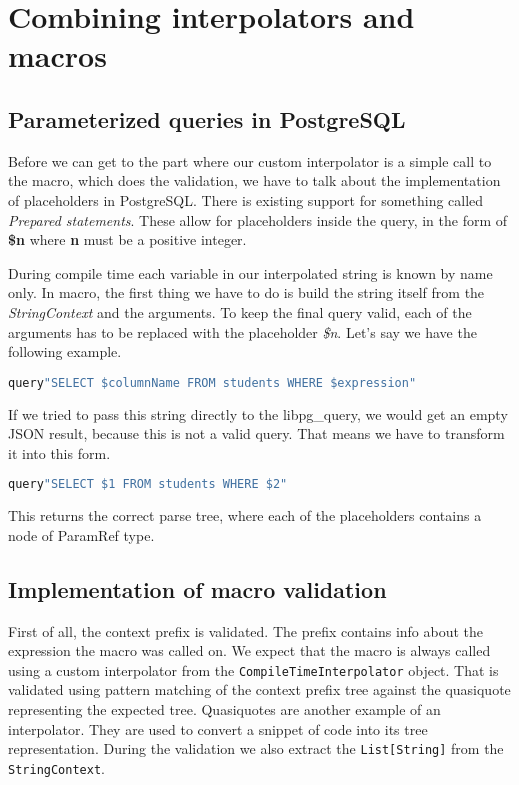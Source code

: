 \section{Combining interpolators and macros}
\subsection{Parameterized queries in PostgreSQL}
Before we can get to the part where our custom interpolator is a simple call to the macro, which does the validation, we have to talk about the implementation of placeholders in PostgreSQL. There is existing support for something called \textit{Prepared statements}. These allow for placeholders inside the query, in the form of \textbf{\$n} where \textbf{n} must be a positive integer.  

During compile time each variable in our interpolated string is known by name only. In macro, the first thing we have to do is build the string itself from the \textit{StringContext} and the arguments. To keep the final query valid, each of the arguments has to be replaced with the placeholder \textit{\$n}. 
Let's say we have the following example.
\begin{lstlisting}[language=scala, basicstyle=\ttfamily, showstringspaces=false]
query"SELECT $columnName FROM students WHERE $expression"
\end{lstlisting}
If we tried to pass this string directly to the libpg\_query, we would get an empty JSON result, because this is not a valid query. That means we have to transform it into this form.
\begin{lstlisting}[language=scala, basicstyle=\ttfamily, showstringspaces=false]
query"SELECT $1 FROM students WHERE $2"
\end{lstlisting}
This returns the correct parse tree, where each of the placeholders contains a node of ParamRef type. 

\subsection{Implementation of macro validation}
First of all, the context prefix is validated. The prefix contains info about the expression the macro was called on. We expect that the macro is always called using a custom interpolator from the \texttt{CompileTimeInterpolator} object. That is validated using pattern matching of the context prefix tree against the quasiquote representing the expected tree. Quasiquotes are another example of an interpolator. They are used to convert a snippet of code into its tree representation.\cite{quasiquotes} During the validation we also extract the \texttt{List[String]} from the \texttt{StringContext}.

